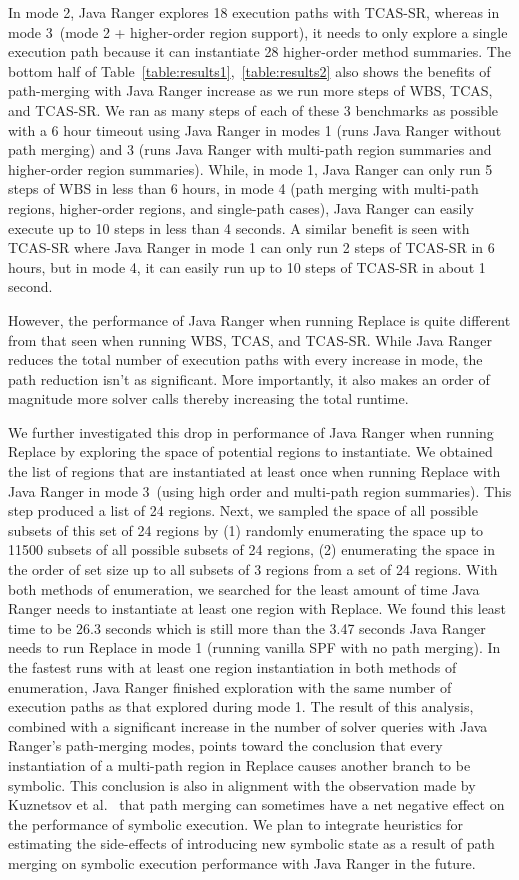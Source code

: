 %
In mode 2, Java Ranger explores 18 execution paths with TCAS-SR, whereas in mode 3~(mode 2 + higher-order region support), it needs to only explore a single
execution path because it can instantiate 28 higher-order method summaries.
%
The bottom half of Table~\ref{table:results1},~\ref{table:results2} also shows the benefits of path-merging with Java Ranger increase as we run
more steps of WBS, TCAS, and TCAS-SR.
%
We ran as many steps of each of these 3 benchmarks as possible with a 6 hour timeout using Java Ranger in modes
1 (runs Java Ranger without path merging) and 3 (runs Java Ranger with multi-path region summaries and higher-order region summaries).
%
While, in mode 1, Java Ranger can only run 5 steps of WBS in less than 6 hours, in mode 4 (path merging with multi-path regions, higher-order regions, and single-path cases),
Java Ranger can easily execute up to 10 steps in less than 4 seconds.
%
A similar benefit is seen with TCAS-SR where Java Ranger in mode 1 can only run 2 steps of TCAS-SR in 6 hours, but in
mode 4, it can easily run up to 10 steps of TCAS-SR in about 1 second.

However, the performance of Java Ranger when running Replace is quite different from that seen when running WBS, TCAS, and TCAS-SR.
%
While Java Ranger reduces the total number of execution paths with every increase in mode, the path reduction isn't as significant.
%
More importantly, it also makes an order of magnitude more solver calls thereby increasing the total runtime.

We further investigated this drop in performance of Java Ranger when running Replace by exploring the space of potential
regions to instantiate.
%
We obtained the list of regions that are instantiated at least once when running Replace with Java Ranger in mode 3~(using
high order and multi-path region summaries).
%
This step produced a list of 24 regions.
%
Next, we sampled the space of all possible subsets of this set of 24 regions by
%
(1) randomly enumerating the space up to 11500 subsets of all possible subsets of 24 regions,
%
(2) enumerating the space in the order of set size up to all subsets of 3 regions from a set of 24 regions.
%
With both methods of enumeration, we searched for the least amount of time Java Ranger needs to instantiate at least one
region with Replace.
%
We found this least time to be 26.3 seconds which is still more than the 3.47 seconds Java Ranger needs to run
Replace in mode 1 (running vanilla SPF with no path merging).
%
In the fastest runs with at least one region instantiation in both methods of enumeration, Java Ranger finished
exploration with the same number of execution paths as that explored during mode 1.
%
The result of this analysis, combined with a significant increase in the number of solver queries with Java Ranger's
path-merging modes, points toward the conclusion that every instantiation of a multi-path region in Replace causes another branch to be
symbolic.
%
This conclusion is also in alignment with the observation made by Kuznetsov et al.~\cite{kuznetsov} that path merging can
sometimes have a net negative effect on the performance of symbolic execution.
%
We plan to integrate heuristics for estimating the side-effects of introducing new symbolic state as a result of
path merging on symbolic execution performance with Java Ranger in the future.
